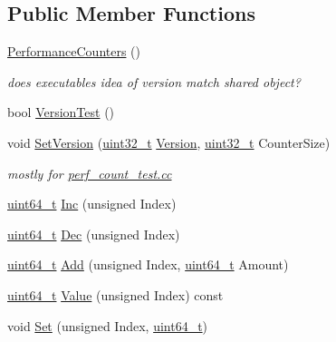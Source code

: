 \subsection*{Public Member Functions}
\begin{DoxyCompactItemize}
\item 
\hyperlink{structleveldb_1_1_performance_counters_a38fb51ba787a3c9976d42cf51e91d83a}{Performance\+Counters} ()
\begin{DoxyCompactList}\small\item\em does executable\textquotesingle{}s idea of version match shared object? \end{DoxyCompactList}\item 
bool \hyperlink{structleveldb_1_1_performance_counters_a6a3f95e126edfc01be7ab96e06cd2efc}{Version\+Test} ()
\item 
void \hyperlink{structleveldb_1_1_performance_counters_a172b2fe0e1886103286cec6981760912}{Set\+Version} (\hyperlink{stdint_8h_a435d1572bf3f880d55459d9805097f62}{uint32\+\_\+t} \hyperlink{classleveldb_1_1_version}{Version}, \hyperlink{stdint_8h_a435d1572bf3f880d55459d9805097f62}{uint32\+\_\+t} Counter\+Size)
\begin{DoxyCompactList}\small\item\em mostly for \hyperlink{perf__count__test_8cc}{perf\+\_\+count\+\_\+test.\+cc} \end{DoxyCompactList}\item 
\hyperlink{stdint_8h_aaa5d1cd013383c889537491c3cfd9aad}{uint64\+\_\+t} \hyperlink{structleveldb_1_1_performance_counters_a6c29cd0f57a2b78edc0cdfdfb0869b21}{Inc} (unsigned Index)
\item 
\hyperlink{stdint_8h_aaa5d1cd013383c889537491c3cfd9aad}{uint64\+\_\+t} \hyperlink{structleveldb_1_1_performance_counters_a634b9661d456ef845b5f593a6de55da0}{Dec} (unsigned Index)
\item 
\hyperlink{stdint_8h_aaa5d1cd013383c889537491c3cfd9aad}{uint64\+\_\+t} \hyperlink{structleveldb_1_1_performance_counters_a8b209c77780935f91c652db6e6db4b5a}{Add} (unsigned Index, \hyperlink{stdint_8h_aaa5d1cd013383c889537491c3cfd9aad}{uint64\+\_\+t} Amount)
\item 
\hyperlink{stdint_8h_aaa5d1cd013383c889537491c3cfd9aad}{uint64\+\_\+t} \hyperlink{structleveldb_1_1_performance_counters_a54bbb0538a6c972ae6658160e0ee0b25}{Value} (unsigned Index) const 
\item 
void \hyperlink{structleveldb_1_1_performance_counters_af4dfb6a50f4d92fdd8dcf9efd2f95586}{Set} (unsigned Index, \hyperlink{stdint_8h_aaa5d1cd013383c889537491c3cfd9aad}{uint64\+\_\+t})

\end{DoxyCompactItemize}
